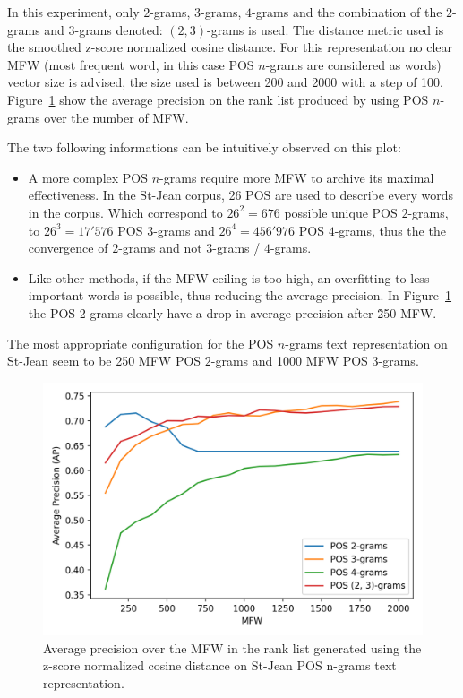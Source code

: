 In this experiment, only $2$-grams, $3$-grams, $4$-grams and the combination of the $2$-grams and $3$-grams denoted: $(2, 3)$-grams is used.
The distance metric used is the smoothed z-score normalized cosine distance.
For this representation no clear MFW (most frequent word, in this case POS $n$-grams are considered as words) vector size is advised, the size used is between 200 and 2000 with a step of 100.
Figure~\ref{fig:pos_ngrams} show the average precision on the rank list produced by using POS $n$-grams over the number of MFW.

The two following informations can be intuitively observed on this plot:
\begin{itemize}
  \item
  A more complex POS $n$-grams require more MFW to archive its maximal effectiveness.
  In the St-Jean corpus, 26 POS are used to describe every words in the corpus.
  Which correspond to $26^2 = 676$ possible unique POS $2$-grams, to $26^3 = 17'576$ POS $3$-grams and $26^4 = 456'976$ POS $4$-grams, thus the the convergence of $2$-grams and not $3$-grams / $4$-grams.
  \item
  Like other methods, if the MFW ceiling is too high, an overfitting to less important words is possible, thus reducing the average precision.
  In Figure~\ref{fig:pos_ngrams} the POS 2-grams clearly have a drop in average precision after \~250-MFW.
\end{itemize}

The most appropriate configuration for the POS $n$-grams text representation on St-Jean seem to be 250 MFW POS $2$-grams and 1000 MFW POS $3$-grams.

\begin{figure}
  \centering
  \caption{Average precision over the MFW in the rank list generated using the z-score normalized cosine distance on St-Jean POS n-grams text representation.}
  \label{fig:pos_ngrams}
  \includegraphics[width=\linewidth]{img/pos_ngrams.png}
\end{figure}

